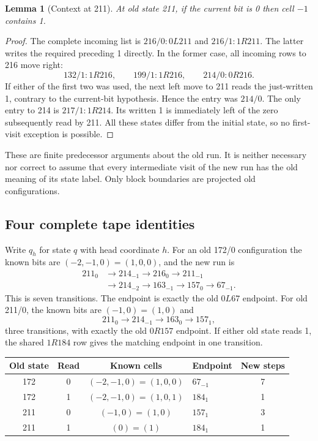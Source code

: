 \documentclass[11pt,letterpaper]{article}
\newtheorem{lemma}[theorem]{Lemma}
\begin{document}
\begin{lemma}[Context at 211]\label{lem:211}
At old state 211, if the current bit is 0 then cell $-1$ contains 1.
\end{lemma}
\begin{proof}
The complete incoming list is $216/0:0L211$ and $216/1:1R211$.
The latter writes the required preceding 1 directly. In the former
case, all incoming rows to 216 move right:
\[
 132/1:1R216,\qquad199/1:1R216,\qquad214/0:0R216.
\]
If either of the first two was used, the next left move to 211 reads
the just-written 1, contrary to the current-bit hypothesis. Hence
the entry was $214/0$. The only entry to 214 is $217/1:1R214$.
Its written 1 is immediately left of the zero subsequently read by 211.
All these states differ from the initial state, so no first-visit
exception is possible.
\end{proof}

These are finite predecessor arguments about the old run. It is neither
necessary nor correct to assume that every intermediate visit of the
new run has the old meaning of its state label. Only block boundaries
are projected old configurations.

\subsection{Four complete tape identities}
Write $q_h$ for state $q$ with head coordinate $h$. For an old 172/0
configuration the known bits are $(-2,-1,0)=(1,0,0)$, and the new run is
\begin{align*}
211_0&\to214_{-1}\to216_0\to211_{-1}\\
 &\to214_{-2}\to163_{-1}\to157_0\to67_{-1}.
\end{align*}
This is seven transitions. The endpoint is exactly the old $0L67$
endpoint. For old 211/0, the known bits are $(-1,0)=(1,0)$ and
\[
211_0\to214_{-1}\to163_0\to157_1,
\]
three transitions, with exactly the old $0R157$ endpoint. If either
old state reads 1, the shared $1R184$ row gives the matching endpoint
in one transition.

\begin{center}\small
\begin{tabular}{ccclc}\toprule
Old state & Read & Known cells & Endpoint & New steps\\\midrule
172 & 0 & $(-2,-1,0)=(1,0,0)$ & $67_{-1}$ & 7\\
172 & 1 & $(-2,-1,0)=(1,0,1)$ & $184_1$ & 1\\
211 & 0 & $(-1,0)=(1,0)$ & $157_1$ & 3\\
211 & 1 & $(0)=(1)$ & $184_1$ & 1\\\bottomrule
\end{tabular}
\end{center}
\end{document}
